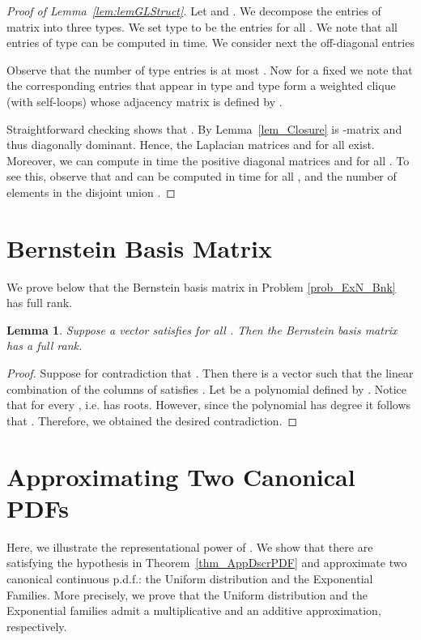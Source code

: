 \documentclass[11pt]{article}
\newcommand{\lemref}[1]{Lemma~\ref{lem:#1}}
\newtheorem{lem}[thm]{Lemma}
\numberwithin{thm}{section}
\begin{document}
\begin{proof}[Proof of \lemref{lemGLStruct}]
Let  and . We decompose the entries of matrix  into three types. We set type  to be the entries  for all . We note that all entries of type  can be computed in  time. We consider next the off-diagonal entries

Observe that the number of type  entries is at most . Now for a fixed  we note that the corresponding entries that appear in type  and type  form
a weighted clique (with self-loops) whose adjacency matrix is defined by .


Straightforward checking shows that .
By Lemma~\ref{lem_Closure}  is -matrix and thus diagonally dominant. Hence, the Laplacian matrices  and  for all  exist. Moreover, we can compute in  time the positive diagonal matrices  and  for all . To see this, observe that  and  can be computed in  time for all , and the number of elements in the disjoint union .
\end{proof}


\section{Bernstein Basis Matrix}\label{appsec:BBM}

We prove below that the Bernstein basis matrix in Problem \ref{prob_ExN_Bnk} has full rank.

\begin{lem}
\label{lem_full_Rank}
Suppose a vector  satisfies
 for all . Then the Bernstein
basis matrix  has a full rank.
\end{lem}

\begin{proof}
Suppose for contradiction that .
Then there is a vector  such that the
linear combination of the columns of 
satisfies .
Let  be a polynomial defined by .
Notice that  for every ,
i.e.  has  roots. However, since
the polynomial  has degree  it follows
that . Therefore, we obtained the desired
contradiction.
\end{proof}



\section{Approximating Two Canonical PDFs}\label{appsec:AGPD}

Here, we illustrate the representational power of . We show that there are  satisfying the hypothesis in Theorem~\ref{thm_AppDscrPDF} and approximate two canonical continuous p.d.f.: the Uniform distribution and the Exponential Families. More precisely, we prove that the Uniform distribution and the Exponential families admit a multiplicative and an additive approximation, respectively.
\end{document}
